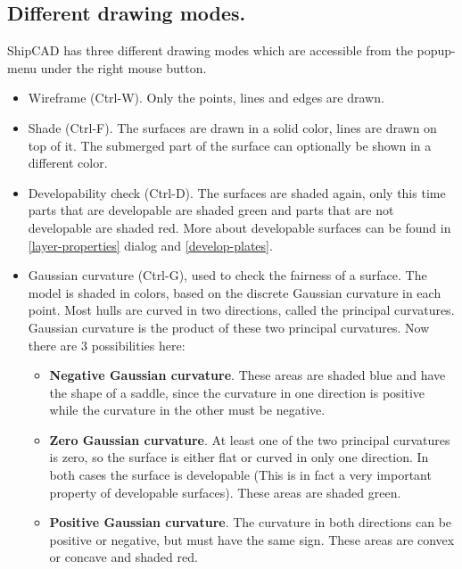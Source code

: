 \documentclass[12pt]{article}
\begin{document}
\subsection{Different drawing modes.}
ShipCAD has three different drawing modes which are accessible from the popup-menu under the
right mouse button.

\begin{itemize}

  \item Wireframe (Ctrl-W). Only the points, lines and edges are drawn.

  \item Shade (Ctrl-F). The surfaces are drawn in a solid color, lines
are drawn on top of it. The submerged part of the surface can
optionally be shown in a different color.

  \item Developability check (Ctrl-D). The surfaces are shaded again,
only this time parts that are developable are shaded green and parts
that are not developable are shaded red. More about developable
surfaces can be found in \ref{layer-properties} dialog
and \ref{develop-plates}.

  \item Gaussian curvature (Ctrl-G), used to check the fairness of a
surface. The model is shaded in colors, based on the discrete Gaussian
curvature in each point. Most hulls are curved in two directions,
called the principal curvatures.  Gaussian curvature is the product of
these two principal curvatures. Now there are 3 possibilities here:

  \begin{itemize}

    \item \textbf{Negative Gaussian curvature}. These areas are shaded blue and
have the shape of a saddle, since the curvature in one direction is
positive while the curvature in the other must be negative.

    \item \textbf{Zero Gaussian curvature}. At least one of the two principal
curvatures is zero, so the surface is either flat or curved in only
one direction. In both cases the surface is developable (This is in
fact a very important property of developable surfaces). These areas
are shaded green.

    \item \textbf{Positive Gaussian curvature}. The curvature in both
directions can be positive or negative, but must have the same
sign. These areas are convex or concave and shaded red.


\end{itemize}
\end{itemize}
\end{document}
